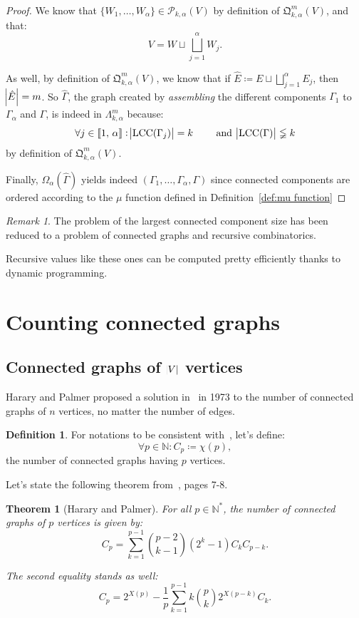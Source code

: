 \documentclass{article}
\newtheorem{theorem}[lemma]{Theorem}
\theoremstyle{definition}
\newtheorem{definition}[lemma]{Definition}
\theoremstyle{remark}
\newtheorem*{remark}{Remark}
\DeclareMathOperator{\LCC}{LCC}
\newcommand{\intint}[2]{\left\llbracket#1, \, #2\right\rrbracket}
\begin{document}
\begin{proof}
			We know that $\{W_1, \ldots, W_\alpha\} \in \mathcal P_{k,\alpha}(V)$ by definition of $\mathfrak Q_{k,\alpha}^m(V)$, and that:
			\[V = W \sqcup \bigsqcup_{j=1}^\alpha W_j.\]

			As well, by definition of $\mathfrak Q_{k,\alpha}^m(V)$, we know that if $\hat E \coloneqq E \sqcup \bigsqcup_{j=1}^\alpha E_j$, then $\abs {\hat E} = m$.
			So $\hat \Gamma$, the graph created by \textit{assembling} the different components $\Gamma_1$ to $\Gamma_\alpha$ and $\Gamma$, is indeed in
			$\Lambda_{k,\alpha}^m$ because:
			\[\forall j \in \intint 1\alpha : \abs {\LCC(\Gamma_j)} = k\qquad \text{ and } \abs {\LCC(\Gamma)} \lneqq k\]
			by definition of $\mathfrak Q_{k,\alpha}^m(V)$.

			Finally, $\Omega_\alpha(\hat \Gamma)$ yields indeed $(\Gamma_1, \ldots, \Gamma_\alpha, \Gamma)$ since connected components are ordered according
			to the $\mu$ function defined in Definition~\ref{def:mu function}
			\end{proof}

			\begin{remark} The problem of the largest connected component size has been reduced to a problem of connected graphs and recursive combinatorics.

			Recursive values like these ones can be computed pretty efficiently thanks to dynamic programming.
			\end{remark}

\section{Counting connected graphs}
	\subsection{Connected graphs of $\abs V$ vertices}
		Harary and Palmer proposed a solution in~\cite{Harary&Palmer1973} in 1973 to the number of connected graphs of $n$ vertices, no matter the number of edges.

		\begin{definition} For notations to be consistent with~\cite{Harary&Palmer1973}, let's define:
		\[\forall p \in \mathbb N : C_p \coloneqq \chi(p),\]
		the number of connected graphs having $p$ vertices.
		\end{definition}

		Let's state the following theorem from~\cite{Harary&Palmer1973}, pages 7-8.

		\begin{theorem}[Harary and Palmer] For all $p \in \mathbb N^*$, the number of connected graphs of $p$ vertices is given by:
		\[C_p = \sum_{k=1}^{p-1}\binom {p-2}{k-1}\left(2^k-1\right)C_kC_{p-k}.\]

		The second equality stands as well:
		\[C_p = 2^{X(p)} - \frac 1p\sum_{k=1}^{p-1}k\binom pk2^{X(p-k)}C_k.\]
		\end{theorem}
\end{document}
